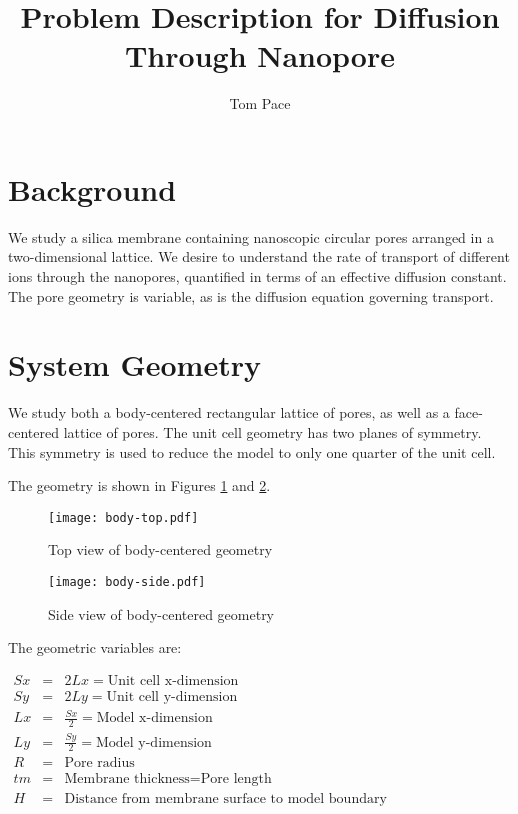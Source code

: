 \documentclass{article}
\begin{document}
\title{Problem Description for Diffusion Through Nanopore}
\author{Tom Pace}
\maketitle

\section{Background}\label{sec:background}

We study a silica membrane containing nanoscopic circular pores arranged in a two-dimensional lattice.
We desire to understand the rate of transport of different ions through the nanopores,
quantified in terms of an effective diffusion constant.
The pore geometry is variable, as is the diffusion equation governing transport.

\section{System Geometry}\label{sec:geometry}

We study both a body-centered rectangular lattice of pores,
as well as a face-centered lattice of pores.
The unit cell geometry has two planes of symmetry.
This symmetry is used to reduce the model to only one quarter of the unit cell.

The geometry is shown in Figures \ref{fig:body-top} and \ref{fig:body-side}.

\begin{figure}[H]
\centering
\texttt{[image: body-top.pdf]}
\caption{Top view of body-centered geometry}
\label{fig:body-top}
\end{figure}

\begin{figure}[H]
\centering
\texttt{[image: body-side.pdf]}
\caption{Side view of body-centered geometry}
\label{fig:body-side}
\end{figure}

The geometric variables are:

$\begin{array}{rcl}
Sx & = & 2 Lx =\text{Unit cell x-dimension} \\
Sy & = & 2 Ly =\text{Unit cell y-dimension} \\
Lx & = & \frac{Sx}{2} =\text{Model x-dimension} \\
Ly & = & \frac{Sy}{2} =\text{Model y-dimension} \\
R & = & \text{Pore radius} \\
tm & = & \text{Membrane thickness} = \text{Pore length} \\
H & = & \text{Distance from membrane surface to model boundary}
\end{array}$
\end{document}
